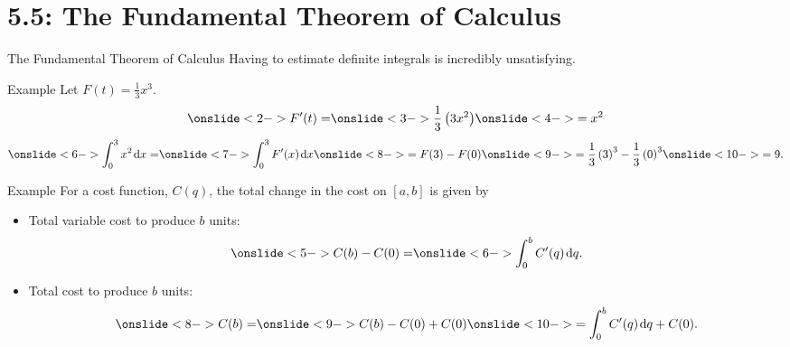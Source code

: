 \documentclass[Lecture.tex]{subfiles}
\begin{document}
\section{5.5: The Fundamental Theorem of Calculus}

\begin{frame}{The Fundamental Theorem of Calculus}
  Having to estimate definite integrals is incredibly unsatisfying.
\end{frame}

\begin{frame}{Example}
  Let $F(t) = \frac{1}{3}x^3$.
  $$\onslide<2->{F^\prime(t) =} \onslide<3->{\frac{1}{3}\left(3x^2\right)} \onslide<4->{= x^2}$$
  $$\onslide<6->{\int_0^3 x^2\dx{x} =} \onslide<7->{\int_0^3 F^\prime(x)\dx{x}} \onslide<8->{= F(3) - F(0)} \onslide<9->{= \frac{1}{3}\left(3\right)^3 - \frac{1}{3}\left(0\right)^3} \onslide<10->{= 9.}$$
  
\end{frame}

\begin{frame}{Example}
  For a cost function, $C(q)$, the total change in the cost on $[a,b]$ is given by

  \begin{itemize}
  \item<4->
    Total variable cost to produce $b$ units:
    $$\onslide<5->{C(b) - C(0) = } \onslide<6->{\int_0^b C^\prime(q)\dx{q}.}$$
  \item<7->
    Total cost to produce $b$ units:
    $$\onslide<8->{C(b) = } \onslide<9->{C(b) - C(0) + C(0)} \onslide<10->{= \int_0^b C^\prime(q)\dx{q} + C(0)}.$$
  \end{itemize}
\end{frame}
\end{document}
